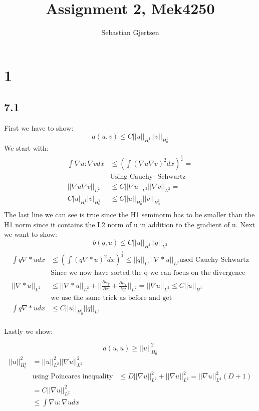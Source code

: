 \documentclass[a4paper,norsk]{article}
\title{Assignment 2, Mek4250}
\author{Sebastian Gjertsen}
\begin{document}
\maketitle
\section*{1}
\subsection*{7.1}
First we have to show:
$$ a(u,v) \leq C ||u||_{H^1_0} ||v||_{H^1_0}  $$
We start with:
\begin{align*}
\int \nabla u : \nabla v dx &\leq (\int (\nabla u  \nabla v)^2 dx)^{\frac{1}{2}} = \\
& \text{Using Cauchy- Schwartz} \\
||\nabla u \nabla v||_{L^2} & \leq  C ||\nabla u||_{L^2} ||\nabla v||_{L^2} = \\
C|u|_{H^1_0} |v|_{H^1_0} & \leq C ||u||_{H^1_0} ||v||_{H^1_0}\\
\end{align*}
The last line we can see is true since the H1 seminorm has to be smaller than the H1 norm since it contains the L2 norm of u in addition to the gradient of u. \newline
Next we want to show:
$$ b(q,u)  \leq C||u||_{H^1_0} ||q||_{L^2}  $$
\begin{align*}
\int q \nabla * u dx &\leq (\int (q \nabla * u)^2 dx)^{\frac{1}{2}} \leq ||q||_{L^2} ||\nabla * u||_{L^2} \text{used Cauchy Schwartz}\\ 
	&\text{Since we now have sorted the q we can focus on the divergence }\\
	||\nabla * u||_{L^2} &\leq  ||\nabla * u||_{L^2} + ||\frac{\partial u_y}{\partial x} +\frac{\partial u_x}{\partial y}||_{L^2} = ||\nabla u||_{L^2} \leq C ||u||_{H^1} \\
	&\text{we use the same trick as before  and get} \\
	\int q \nabla * u dx & \leq C||u||_{H^1_0} ||q||_{L^2} \\
\end{align*}

Lastly we show:

$$ a(u,u) \geq ||u||^2_{H^1_0}  $$
\begin{align*}
||u||^2_{H^1_0} &= ||u||^2_{L^2} ||\nabla u||^2_{L^2}\\   
	  &\text{using Poincares inequality}
           & \leq D||\nabla u||^2_{L^2} + ||\nabla u||^2_{L^2} = ||\nabla u||^2_{L^2} (D+1) \\
           & = C ||\nabla u||^2_{L^2} \\
           & \leq \int \nabla u : \nabla u dx
\end{align*}
\end{document}
